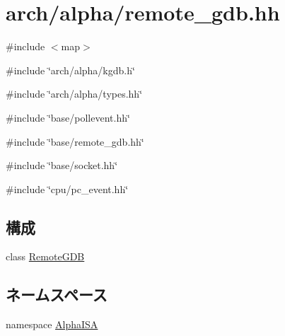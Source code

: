 \hypertarget{arch_2alpha_2remote__gdb_8hh}{
\section{arch/alpha/remote\_\-gdb.hh}
\label{arch_2alpha_2remote__gdb_8hh}
}
{\ttfamily \#include $<$map$>$}\par
{\ttfamily \#include \char`\"{}arch/alpha/kgdb.h\char`\"{}}\par
{\ttfamily \#include \char`\"{}arch/alpha/types.hh\char`\"{}}\par
{\ttfamily \#include \char`\"{}base/pollevent.hh\char`\"{}}\par
{\ttfamily \#include \char`\"{}base/remote\_\-gdb.hh\char`\"{}}\par
{\ttfamily \#include \char`\"{}base/socket.hh\char`\"{}}\par
{\ttfamily \#include \char`\"{}cpu/pc\_\-event.hh\char`\"{}}\par
\subsection*{構成}
\begin{DoxyCompactItemize}
\item 
class \hyperlink{classAlphaISA_1_1RemoteGDB}{RemoteGDB}
\end{DoxyCompactItemize}
\subsection*{ネームスペース}
\begin{DoxyCompactItemize}
\item 
namespace \hyperlink{namespaceAlphaISA}{AlphaISA}
\end{DoxyCompactItemize}
